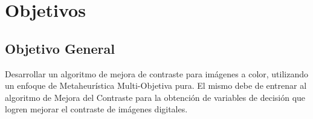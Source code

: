 


\section{Objetivos}
\subsection{Objetivo General}
Desarrollar un algoritmo de mejora de contraste para imágenes a color, utilizando un enfoque de Metaheurística Multi-Objetiva pura. El mismo debe de entrenar al algoritmo de Mejora del Contraste para la obtención de variables de decisión que logren mejorar el contraste de imágenes digitales. 
